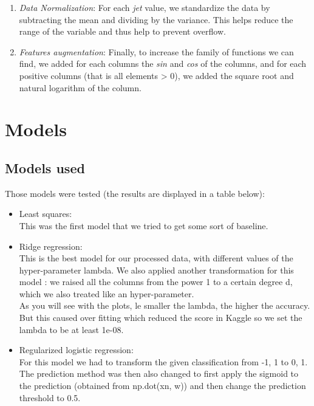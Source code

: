 \documentclass[a4paper]{article}
\begin{document}
\begin{multicols*}{2}
\begin{enumerate}
\item \textit{Data Normalization}: For each \textit{jet} value, we standardize the data by subtracting the mean and dividing by the variance. This helps reduce the range of the variable and thus help to prevent overflow.

\item \textit{Features augmentation}: Finally, to increase the family of functions we can find, we added for each columns the \textit{sin} and \textit{cos} of the columns, and for each positive columns (that is all elements > 0), we added the square root and natural logarithm of the column.
\end{enumerate}

\section{Models}
\subsection{Models used}
Those models were tested (the results are displayed in a table below):

\begin{itemize}
\item Least squares:\\
\hspace*{3mm}This was the first model that we tried to get some sort of baseline.
\item Ridge regression:\\
\hspace*{3mm}This is the best model for our processed data, with different values of the hyper-parameter lambda. We also applied another transformation for this model : we raised all the columns from the power 1 to a certain degree d, which we also treated like an hyper-parameter. \\As you will see with the plots, le smaller the lambda, the higher the accuracy. But this caused over fitting which reduced the score in Kaggle so we set the lambda to be at least 1e-08. 
\item Regularized logistic regression:\\
\hspace*{3mm}For this model we had to transform the given classification from {-1, 1} to {0, 1}. The prediction method was then also changed to first apply the sigmoid to the prediction (obtained from np.dot(xn, w)) and then change the prediction threshold to 0.5. 
\end{itemize}


\end{multicols*}
\end{document}
